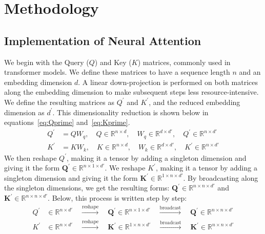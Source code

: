 \documentclass{article}
\begin{document}
\section{Methodology}
\label{sec:methodology}

\subsection{Implementation of Neural Attention}
\label{subsec:implementation}
We begin with the Query ($\mathit{Q}$) and Key ($\mathit{K}$) matrices, commonly used in transformer models. We define these matrices to have a sequence length $n$ and an embedding dimension $d$.
A linear down-projection is performed on both matrices along the embedding dimension to make subsequent steps less resource-intensive. We define the resulting matrices as $\mathit{Q}^{\prime}$ and $\mathit{K}^{\prime}$, and the reduced embedding dimension as $d^{\prime}$. This dimensionality reduction is shown below in equations~\ref{eq:Qprime} and~\ref{eq:Kprime}.
\begin{align}
    \mathit{Q}^{\prime} &= \mathit{Q} \mathit{W}_q, \quad \mathit{Q} \in \mathbb{R}^{n \times d}, \quad \mathit{W}_q \in \mathbb{R}^{d \times d'}, \quad \mathit{Q}^{\prime} \in \mathbb{R}^{n \times d'} \label{eq:Qprime}\\
    \mathit{K}^{\prime} &= \mathit{K} \mathit{W}_k, \quad \mathit{K} \in \mathbb{R}^{n \times d}, \quad \mathit{W}_k \in \mathbb{R}^{d \times d'}, \quad \mathit{K}^{\prime} \in \mathbb{R}^{n \times d'} \label{eq:Kprime}
\end{align}
We then reshape $\mathit{Q}^{\prime}$, making it a tensor by adding a singleton dimension and giving it the form
$\mathbf{Q^{\prime}} \in \mathbb{R}^{n \times 1 \times d'}$. We reshape $\mathit{K^{\prime}}$, making it a tensor by adding a singleton dimension and giving it the form $\mathbf{K^{\prime}} \in \mathbb{R}^{1 \times n \times d'}$. By broadcasting along the singleton dimensions, we get the resulting forms: $\mathbf{Q^{\prime}} \in \mathbb{R}^{n \times n \times d'}$ and $\mathbf{K^{\prime}} \in \mathbb{R}^{n \times n \times d'}$. Below, this process is written step by step:
\begin{align*}
\mathit{Q}^{\prime} &\in \mathbb{R}^{n \times d'} \quad \xrightarrow{\text{reshape}} \quad \mathbf{Q}^{\prime} \in \mathbb{R}^{n \times 1 \times d'} \quad \xrightarrow{\text{broadcast}} \quad \mathbf{Q}^{\prime} \in \mathbb{R}^{n \times n \times d'} \\
\mathit{K}^{\prime} &\in \mathbb{R}^{n \times d'} \quad \xrightarrow{\text{reshape}} \quad \mathbf{K}^{\prime} \in \mathbb{R}^{1 \times n \times d'} \quad \xrightarrow{\text{broadcast}} \quad \mathbf{K}^{\prime} \in \mathbb{R}^{n \times n \times d'}
\end{align*}
\end{document}
